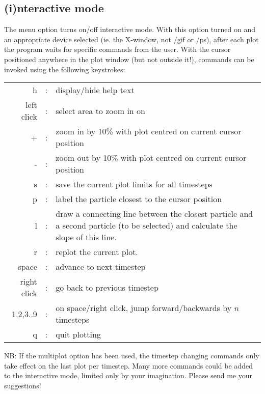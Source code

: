 \documentclass[a4paper,12pt]{article}
\begin{document}
\subsection{(i)nteractive mode}
 The menu option turns on/off interactive mode. With this option turned on and
an appropriate device selected (ie. the X-window, not /gif or /ps), after
each plot the program waits for specific commands from the user. With the cursor
positioned anywhere in the plot window (but not outside it!), commands can be invoked using the
following keystrokes:

\begin{tabular}{rcp{}}
 h & : & display/hide help text \\
 left click & : & select area to zoom in on \\
 + & : & zoom in by 10\% with plot centred on current cursor position \\
 - & : & zoom out by 10\% with plot centred on current cursor position \\ 
 s & : & save the current plot limits for all timesteps \\
 p & : & label the particle closest to the cursor position \\
 l & : & draw a connecting line between the closest particle and a second
 particle (to be selected) and calculate the slope of this line. \\
 r & : & replot the current plot. \\
 space & : & advance to next timestep \\
 right click & : & go back to previous timestep \\
  1,2,3..9 & : & on space/right click, jump forward/backwards by $n$ timesteps \\
  q & : & quit plotting 
\end{tabular}

 NB: If the multiplot option has been used, the timestep changing commands only
take effect on the last plot per timestep. Many more commands could be added to
the interactive mode, limited only by your imagination. Please send me your suggestions!
\end{document}

